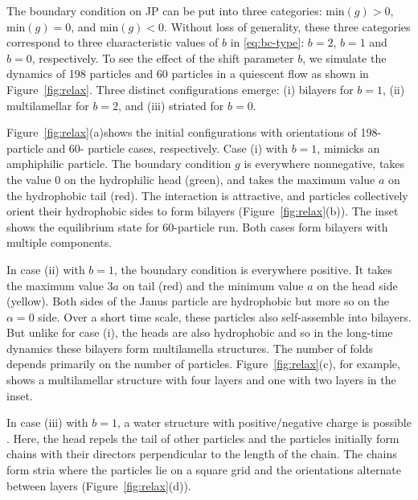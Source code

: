 \documentclass[prb,preprint,showpacs,preprintnumbers,amsmath,amssymb,longbibliography]{revtex4-1}
\begin{document}
The boundary condition on JP can be put into three categories: min$(g) >0$, min$(g) =0$, and min$(g) <0$. Without loss of generality, 
these three categories correspond to three characteristic values of $b$ in \eqref{eq:bc-type}: $b=2$, $b=1$ and $b=0$, respectively. 
%
To see the effect of the shift parameter $b$, we simulate the dynamics of
198 particles and 60 particles in a quiescent flow as shown in Figure~\ref{fig:relax}.
Three distinct configurations emerge:
(i) bilayers for $b = 1$, 
(ii) multilamellar for $b = 2$, and 
(iii) striated for $b = 0$.

Figure~\ref{fig:relax}(a)shows the initial configurations with orientations of 198-particle and 60- particle cases,
respectively. 
Case (i) with $b = 1$, mimicks an amphiphilic particle.
The boundary condition $g$ is everywhere nonnegative,
takes the value $0$ on the
hydrophilic head (green),
and takes the maximum value $a$ on the
hydrophobic tail (red). 
The interaction is attractive, and particles collectively orient their
hydrophobic sides to form bilayers  (Figure~\ref{fig:relax}(b)). The inset shows the equilibrium 
state for 60-particle run.
Both cases form bilayers with multiple components. 

In case (ii) with $b = 1$, the boundary condition is everywhere positive.
It takes the maximum value $3a$ on tail (red) and the
minimum value $a$ on the head side (yellow). 
Both sides of the Janus particle are hydrophobic but
more so on the $\alpha = 0$ side.  
Over a short time scale, these particles also self-assemble into bilayers. But unlike for case (i),
the heads are also hydrophobic and so in the long-time dynamics
these bilayers form multilamella structures.
The number of folds depends primarily on the number of particles.
Figure~\ref{fig:relax}(c), for example, shows a
multilamellar structure with four layers and one with two layers in the inset.

In case (iii) with $b=1$,
a water structure with
positive/negative charge is possible \cite{MaRa76, Ma77}.
Here, the head repels the tail of other particles
and the particles initially form chains with their directors perpendicular
to the length of the chain.  
The chains form stria
where the particles lie on a 
square grid and the orientations alternate
between layers (Figure~\ref{fig:relax}(d)).
\end{document}

